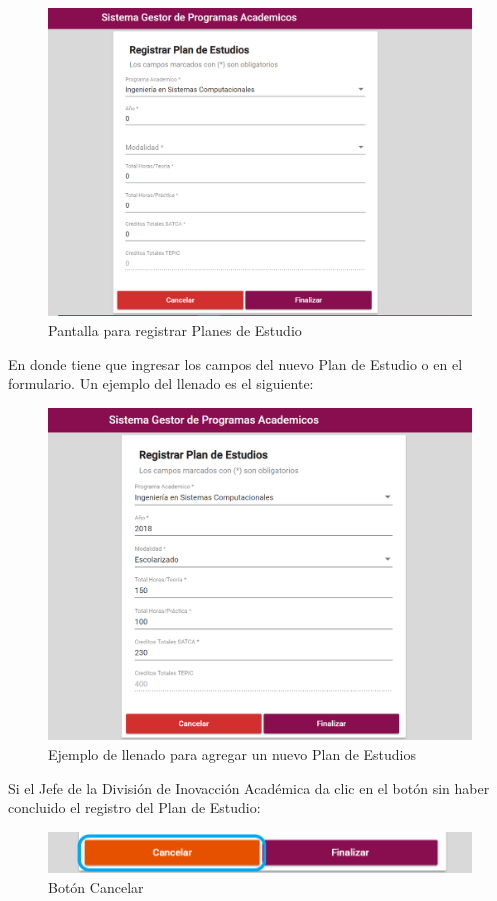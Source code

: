 \begin{figure}[H]
	\centering
	\hypertarget{registrarPE}{\includegraphics[width=0.7\linewidth]{images/SP4-GPE/registrarPE}}
	\caption{Pantalla para registrar Planes de Estudio}
	\label{registrarPE}
\end{figure}
\newpage
En donde tiene que ingresar los campos del nuevo Plan de Estudio o en el formulario. Un ejemplo del llenado es el siguiente:

\begin{figure}[H]
	\centering
	\hypertarget{ejreg}{\includegraphics[width=0.7\linewidth]{images/SP4-GPE/registrarEjem}}
	\caption{Ejemplo de llenado para agregar un nuevo Plan de Estudios}
	\label{ejreg}
\end{figure}
Si el Jefe de la División de Inovacción Académica da clic en el botón  sin haber concluido el registro del Plan de Estudio:

\begin{figure}[H]
	\centering
	\hypertarget{cancel2}{\includegraphics[width=0.7\linewidth]{images/SP4-GPE/cancelarPE}}
	\caption{Botón Cancelar}
	\label{cancel2}
\end{figure}
\newpage

